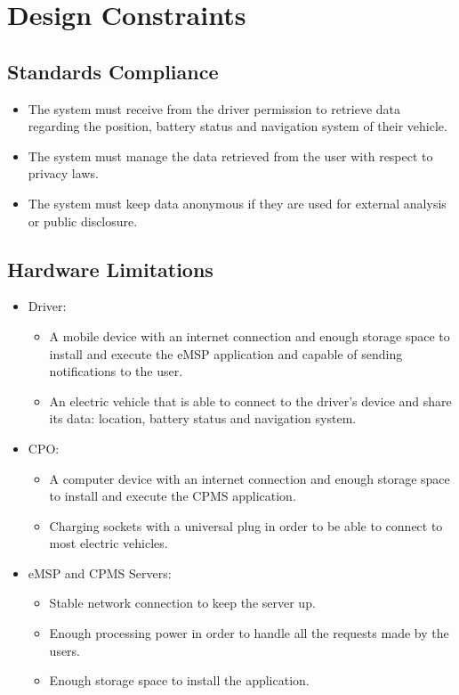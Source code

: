 \section{Design Constraints}
\label{sec:designConstraints}
\subsection{Standards Compliance}
\label{subsec:standardsCompliance}
\begin{itemize}
    \item The system must receive from the driver permission to retrieve data regarding the position, battery status and navigation system of their vehicle.
    \item The system must manage the data retrieved from the user with respect to privacy laws.
    \item The system must keep data anonymous if they are used for external analysis or public disclosure.
\end{itemize}
\subsection{Hardware Limitations}
\label{subsec:hardwareLimitations}
\begin{itemize}
    \item Driver:
    \begin{itemize}
        \item A mobile device with an internet connection and enough storage space to install and execute the eMSP application and capable of sending notifications to the user.
        \item An electric vehicle that is able to connect to the driver's device and share its data: location, battery status and navigation system.
    \end{itemize}
    \item CPO:
    \begin{itemize}
        \item A computer device with an internet connection and enough storage space to install and execute the CPMS application.
        \item Charging sockets with a universal plug in order to be able to connect to most electric vehicles.
    \end{itemize}
    \newpage
    \item eMSP and CPMS Servers:
    \begin{itemize}
        \item Stable network connection to keep the server up.
        \item Enough processing power in order to handle all the requests made by the users.
        \item Enough storage space to install the application.
    \end{itemize}
\end{itemize}

